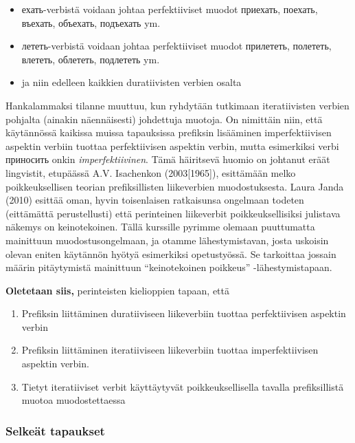 \documentclass[]{scrartcl}
\providecommand{\tightlist}{%
  \setlength{\itemsep}{0pt}\setlength{\parskip}{0pt}}
\begin{document}
\begin{itemize}
\tightlist
\item
  ехать-verbistä voidaan johtaa perfektiiviset muodot приехать, поехать,
  въехать, объехать, подъехать ym.
\item
  лететь-verbistä voidaan johtaa perfektiiviset muodot прилететь,
  полететь, влететь, облететь, подлететь ym.
\item
  ja niin edelleen kaikkien duratiivisten verbien osalta
\end{itemize}

Hankalammaksi tilanne muuttuu, kun ryhdytään tutkimaan iteratiivisten
verbien pohjalta (ainakin näennäisesti) johdettuja muotoja. On nimittäin
niin, että käytännössä kaikissa muissa tapauksissa prefiksin lisääminen
imperfektiivisen aspektin verbiin tuottaa perfektiivisen aspektin
verbin, mutta esimerkiksi verbi приносить onkin \emph{imperfektiivinen}.
Tämä häiritsevä huomio on johtanut eräät lingvistit, etupäässä A.V.
Isachenkon (2003{[}1965{]}), esittämään melko poikkeuksellisen teorian
prefiksillisten liikeverbien muodostuksesta. Laura Janda (2010) esittää
oman, hyvin toisenlaisen ratkaisunsa ongelmaan todeten (eittämättä
perustellusti) että perinteinen liikeverbit poikkeuksellisiksi julistava
näkemys on keinotekoinen. Tällä kurssille pyrimme olemaan puuttumatta
mainittuun muodostusongelmaan, ja otamme lähestymistavan, josta uskoisin
olevan eniten käytännön hyötyä esimerkiksi opetustyössä. Se tarkoittaa
jossain määrin pitäytymistä mainittuun ``keinotekoinen poikkeus''
-lähestymistapaan.

\textbf{Oletetaan siis,} perinteisten kielioppien tapaan, että

\begin{enumerate}
\def\labelenumi{\arabic{enumi}.}
\tightlist
\item
  Prefiksin liittäminen duratiiviseen liikeverbiin tuottaa
  perfektiivisen aspektin verbin
\item
  Prefiksin liittäminen iteratiiviseen liikeverbiin tuottaa
  imperfektiivisen aspektin verbin.
\item
  Tietyt iteratiiviset verbit käyttäytyvät poikkeuksellisella tavalla
  prefiksillistä muotoa muodostettaessa
\end{enumerate}

\subsubsection{Selkeät tapaukset}\label{selkeuxe4t-tapaukset}
\end{document}
